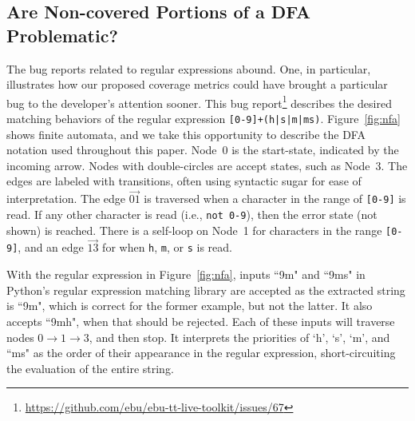 \subsection{Are Non-covered Portions of a DFA Problematic?}
The bug reports related to regular expressions abound. One, in particular, illustrates how our proposed coverage metrics could have brought a particular bug to the developer's attention sooner. This bug report\footnote{\url{https://github.com/ebu/ebu-tt-live-toolkit/issues/67}} describes the desired matching behaviors of the regular expression \verb![0-9]+(h|s|m|ms)!. Figure~\ref{fig:nfa} shows finite automata, and we take this opportunity to describe the DFA notation used throughout this paper. 
Node~0 is the start-state, indicated by the incoming arrow. Nodes with double-circles are accept states, such as Node~3. The edges are labeled with transitions, often using syntactic sugar for ease of interpretation. The edge $\overrightarrow{01}$ is traversed when a character in the range of \verb![0-9]! is read. If any other character is read (i.e., \verb!not 0-9!), then the error state (not shown) is reached. There is a self-loop on Node~1 for characters in the range \verb![0-9]!, and an edge $\overrightarrow{13}$ for when \verb!h!, \verb!m!, or \verb!s! is read. 

With the regular expression in Figure~\ref{fig:nfa},  inputs ``9m" and ``9ms" in Python's regular expression matching library are accepted as the extracted string is ``9m", which is correct for the former example, but not the latter. It also accepts ``9mh", when that should be rejected. 
Each of these inputs will traverse nodes $0 \rightarrow 1 \rightarrow 3$, and then stop. 
It interprets the priorities of `h', `s', `m', and ``ms" as the order of their appearance in the regular expression, short-circuiting the evaluation of the entire string. 


